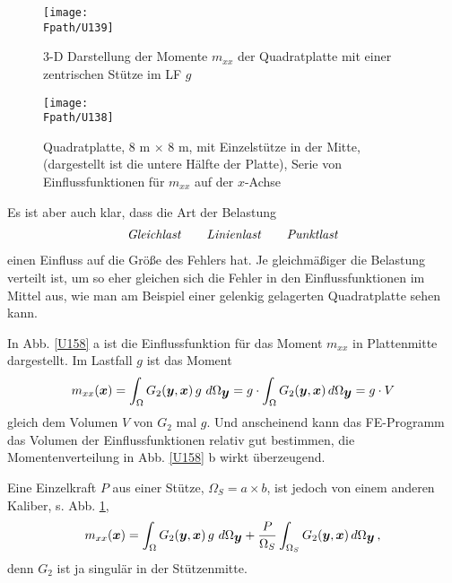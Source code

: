 {%
\begin{figure}[tbp]
\centering
\if {} \sidecaption \fi
\texttt{[image: \\Fpath/U139]}
  \caption{3-D Darstellung der Momente $m_{xx}$ der Quadratplatte mit einer zentrischen St\"{u}tze im LF $g$}
  \label{U139}
\end{figure}
\begin{figure}[tbp]
\centering
\if {} \sidecaption \fi
\texttt{[image: \\Fpath/U138]}
  \caption{Quadratplatte, 8 m $\times$ 8 m, mit Einzelst\"{u}tze in der Mitte, (dargestellt ist die untere H\"{a}lfte der Platte), Serie von Einflussfunktionen f\"{u}r $m_{xx}$ auf der $x$-Achse}
  \label{U138}
\end{figure}
Es ist aber auch klar, dass die Art der Belastung
\begin{align}
\text{{\em Gleichlast\/}} \qquad\text{{\em Linienlast\/}} \qquad \text{{\em Punktlast\/}}
\end{align}
einen Einfluss auf die Gr\"{o}{\ss}e des Fehlers hat. Je gleichm\"{a}{\ss}iger die Belastung verteilt ist, um so eher gleichen sich die Fehler in den Einflussfunktionen im Mittel aus, wie man am Beispiel einer gelenkig gelagerten Quadratplatte sehen kann.

In Abb.  \ref{U158} a ist die Einflussfunktion f\"{u}r das Moment $m_{xx}$ in Plattenmitte dargestellt. Im Lastfall $g$ ist das Moment
\begin{align}
m_{xx}(\mbox{\boldmath $x$}) = \int_{\Omega} G_2(\mbox{\boldmath $y$},\mbox{\boldmath $x$})\,g\,\,d\Omega_{\mbox{\boldmath $y$}} = g \cdot \int_{\Omega} G_2(\mbox{\boldmath $y$},\mbox{\boldmath $x$})\,d\Omega_{\mbox{\boldmath $y$}} = g \cdot V
\end{align}
gleich dem Volumen $V$ von $G_2$ mal $g$. Und anscheinend kann das FE-Pro\-gramm das Volumen der Einflussfunktionen relativ gut bestimmen, die
Momentenverteilung in Abb. \ref{U158} b wirkt \"{u}berzeugend.

Eine Einzelkraft $ P$ aus einer St\"{u}tze, $\Omega_S = a \times b$, ist jedoch von einem anderen Kaliber, s. Abb. \ref{U139},
\begin{align}\label{Eq134}
m_{xx}(\mbox{\boldmath $x$}) = \int_{\Omega} G_2(\mbox{\boldmath $y$},\mbox{\boldmath $x$})\,g\,\,d\Omega_{\mbox{\boldmath $y$}} + \frac{P}{\Omega_S} \int_{\Omega_S} G_2(\mbox{\boldmath $y$},\mbox{\boldmath $x$})\,d\Omega_{\mbox{\boldmath $y$}}\,,
\end{align}
denn $G_2$ ist ja singul\"{a}r in der St\"{u}tzenmitte.

}
